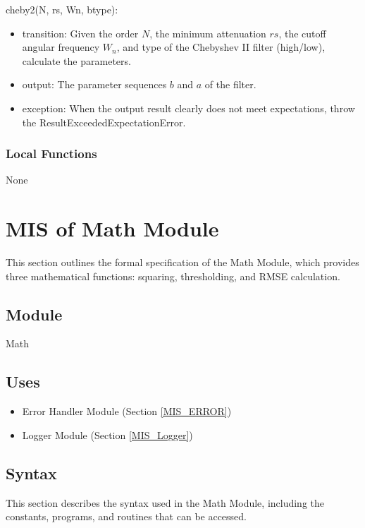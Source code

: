 \documentclass[12pt, titlepage]{article}
\begin{document}
\noindent cheby2(N, rs, Wn, btype):
\begin{itemize}
\item transition: Given the order $N$, the minimum attenuation $rs$, the cutoff
angular frequency $W_n$, and type of the Chebyshev II filter (high/low),
calculate the parameters.
\item output: The parameter sequences $b$ and $a$ of the filter.
\item exception: When the output result clearly does not meet expectations,
throw the ResultExceededExpectationError.
\end{itemize}

\subsubsection{Local Functions}

None

\newpage

\section{MIS of Math Module} \label{MIS_Math}

This section outlines the formal specification of the Math Module, which
provides three mathematical functions: squaring, thresholding, and RMSE
calculation.

\subsection{Module}

Math

\subsection{Uses}

\begin{itemize}
\item Error Handler Module (Section \ref{MIS_ERROR})
\item Logger Module (Section \ref{MIS_Logger})
\end{itemize}

\subsection{Syntax}

This section describes the syntax used in the Math Module, including the
constants, programs, and routines that can be accessed.
\end{document}
